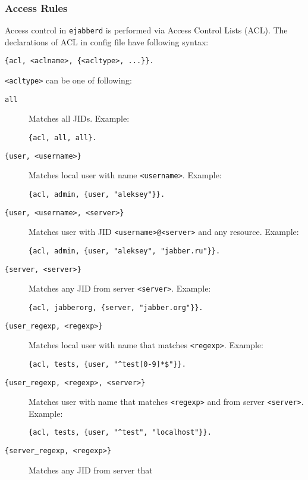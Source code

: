 \documentclass[10pt]{article}
\newcommand{\ejabberd}{\texttt{ejabberd}}
\begin{document}



\subsubsection{Access Rules}
\label{sec:configaccess}

Access control in \ejabberd{} is performed via Access Control Lists (ACL).  The
declarations of ACL in config file have following syntax:
\begin{verbatim}
{acl, <aclname>, {<acltype>, ...}}.
\end{verbatim}

\texttt{<acltype>} can be one of following:
\begin{description}
\item[\texttt{all}] Matches all JIDs.  Example:
\begin{verbatim}
{acl, all, all}.
\end{verbatim}
\item[\texttt{\{user, <username>\}}] Matches local user with name
  \texttt{<username>}.  Example:
\begin{verbatim}
{acl, admin, {user, "aleksey"}}.
\end{verbatim}
\item[\texttt{\{user, <username>, <server>\}}] Matches user with JID
  \texttt{<username>@<server>} and any resource.  Example:
\begin{verbatim}
{acl, admin, {user, "aleksey", "jabber.ru"}}.
\end{verbatim}
\item[\texttt{\{server, <server>\}}] Matches any JID from server
  \texttt{<server>}.  Example:
\begin{verbatim}
{acl, jabberorg, {server, "jabber.org"}}.
\end{verbatim}
\item[\texttt{\{user\_regexp, <regexp>\}}] Matches local user with name that
  matches \texttt{<regexp>}.  Example:
\begin{verbatim}
{acl, tests, {user, "^test[0-9]*$"}}.
\end{verbatim}
\item[\texttt{\{user\_regexp, <regexp>, <server>\}}] Matches user with name
  that matches \texttt{<regexp>} and from server \texttt{<server>}.  Example:
\begin{verbatim}
{acl, tests, {user, "^test", "localhost"}}.
\end{verbatim}
\item[\texttt{\{server\_regexp, <regexp>\}}] Matches any JID from server that

\end{description}
\end{document}
